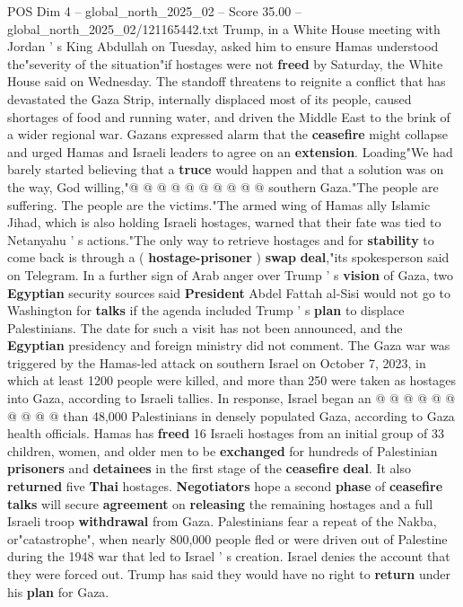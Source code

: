 \begin{textsample}{POS Dim 4 – global\_north\_2025\_02 – Score 35.00 – global\_north\_2025\_02/121165442.txt}
Trump, in a White House meeting with Jordan ' s King Abdullah on Tuesday, asked him to ensure Hamas understood the"severity of the situation"if hostages were not \textbf{freed} by Saturday, the White House said on Wednesday.
The standoff threatens to reignite a conflict that has devastated the Gaza Strip, internally displaced most of its people, caused shortages of food and running water, and driven the Middle East to the brink of a wider regional war.
Gazans expressed alarm that the \textbf{ceasefire} might collapse and urged Hamas and Israeli leaders to agree on an \textbf{extension}.
Loading"We had barely started believing that a \textbf{truce} would happen and that a solution was on the way, God willing,"@ @ @ @ @ @ @ @ @ @ southern Gaza."The people are suffering.
The people are the victims."The armed wing of Hamas ally Islamic Jihad, which is also holding Israeli hostages, warned that their fate was tied to Netanyahu ' s actions."The only way to retrieve hostages and for \textbf{stability} to come back is through a ( \textbf{hostage-prisoner} ) \textbf{swap} \textbf{deal},"its spokesperson said on Telegram.
In a further sign of Arab anger over Trump ' s \textbf{vision} of Gaza, two \textbf{Egyptian} security sources said \textbf{President} Abdel Fattah al-Sisi would not go to Washington for \textbf{talks} if the agenda included Trump ' s \textbf{plan} to displace Palestinians.
The date for such a visit has not been announced, and the \textbf{Egyptian} presidency and foreign ministry did not comment.
The Gaza war was triggered by the Hamas-led attack on southern Israel on October 7, 2023, in which at least 1200 people were killed, and more than 250 were taken as hostages into Gaza, according to Israeli tallies.
In response, Israel began an @ @ @ @ @ @ @ @ @ @ than 48,000 Palestinians in densely populated Gaza, according to Gaza health officials.
Hamas has \textbf{freed} 16 Israeli hostages from an initial group of 33 children, women, and older men to be \textbf{exchanged} for hundreds of Palestinian \textbf{prisoners} and \textbf{detainees} in the first stage of the \textbf{ceasefire} \textbf{deal}.
It also \textbf{returned} five \textbf{Thai} hostages. \textbf{Negotiators} hope a second \textbf{phase} of \textbf{ceasefire} \textbf{talks} will secure \textbf{agreement} on \textbf{releasing} the remaining hostages and a full Israeli troop \textbf{withdrawal} from Gaza.
Palestinians fear a repeat of the Nakba, or"catastrophe", when nearly 800,000 people fled or were driven out of Palestine during the 1948 war that led to Israel ' s creation.
Israel denies the account that they were forced out.
Trump has said they would have no right to \textbf{return} under his \textbf{plan} for Gaza.

\end{textsample}
